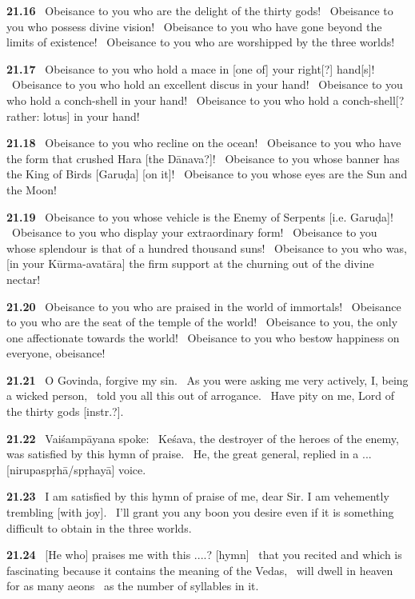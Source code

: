 \documentclass{article}
\begin{document}
\textbf{21.16}%
\ Obeisance to you who are the delight of the thirty gods!%
\ Obeisance to you who possess divine vision!%
\ Obeisance to you who have gone beyond the limits of existence!%
\ Obeisance to you who are worshipped by the three worlds!%


\textbf{21.17}%
\ Obeisance to you who hold a mace in [one of] your right[?] hand[s]!%
\ Obeisance to you who hold an excellent discus in your hand!%
\ Obeisance to you who hold a conch-shell in your hand!%
\ Obeisance to you who hold a conch-shell[? rather: lotus] in your hand!%


\textbf{21.18}%
\ Obeisance to you who recline on the ocean!%
\ Obeisance to you who have the form that crushed Hara [the Dānava?]!%
\ Obeisance to you whose banner has the King of Birds [Garuḍa] [on it]!%
\ Obeisance to you whose eyes are the Sun and the Moon!%


\textbf{21.19}%
\ Obeisance to you whose vehicle is the Enemy of Serpents [i.e. Garuḍa]!%
\ Obeisance to you who display your extraordinary form!%
\ Obeisance to you whose splendour is that of a hundred thousand suns!%
\ Obeisance to you who was, [in your Kūrma-avatāra] the firm support at the churning out of the divine nectar!%


\textbf{21.20}%
\ Obeisance to you who are praised in the world of immortals!%
\ Obeisance to you who are the seat of the temple of the world!%
\ Obeisance to you, the only one affectionate towards the world!%
\ Obeisance to you who bestow happiness on everyone, obeisance!%


\textbf{21.21}%
\ O Govinda, forgive my sin.%
\ As you were asking me very actively, I, being a wicked person,%
\ told you all this out of arrogance.%
\ Have pity on me, Lord of the thirty gods [instr.?].%


\textbf{21.22}%
\ Vaiśampāyana spoke:%
\ Keśava, the destroyer of the heroes of the enemy, was satisfied by this hymn of praise.%
\ He, the great general, replied in a ... [nirupaspṛhā/spṛhayā] voice.%


\textbf{21.23}%
\ I am satisfied by this hymn of praise of me, dear Sir. I am vehemently trembling [with joy].%
\ I'll grant you any boon you desire even if it is something difficult to obtain in the three worlds.%


\textbf{21.24}%
\ [He who] praises me with this ....?  [hymn]%
\ that you recited and which is fascinating because it contains the meaning of the Vedas,%
\ will dwell in heaven for as many aeons%
\ as the number of syllables in it.%
\end{document}
